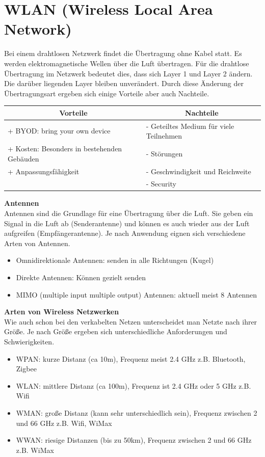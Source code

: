 \chapter{WLAN (Wireless Local Area Network)}
Bei einem drahtlosen Netzwerk findet die Übertragung ohne Kabel statt. Es werden elektromagnetische Wellen über die Luft übertragen. Für die drahtlose Übertragung im Netzwerk bedeutet dies, dass sich Layer 1 und Layer 2 ändern. Die darüber liegenden Layer bleiben unverändert. Durch diese Änderung der Übertragungsart ergeben sich einige Vorteile aber auch Nachteile.

\begin{table}[H]
	\begin{tabular}{l|l}
		\multicolumn{1}{c}{Vorteile} & \multicolumn{1}{c}{Nachteile} \\
		\hline
		+ BYOD: bring your own device & - Geteiltes Medium für viele Teilnehmen \\
		+ Kosten: Besonders in bestehenden Gebäuden & - Störungen \\
		+ Anpassungsfähigkeit & - Geschwindigkeit und Reichweite \\
		& - Security \\
	\end{tabular}
\end{table}

\textbf{Antennen} \\
Antennen sind die Grundlage für eine Übertragung über die Luft. Sie geben ein Signal in die Luft ab (Senderantenne) und können es auch wieder aus der Luft aufgreifen (Empfängerantenne). Je nach Anwendung eignen sich verschiedene Arten von Antennen.
\begin{itemize}
	\item Omnidirektionale Antennen: senden in alle Richtungen (Kugel)
	\item Direkte Antennen: Können gezielt senden
	\item MIMO (multiple input multiple output) Antennen: aktuell meist 8 Antennen
\end{itemize}

\textbf{Arten von Wireless Netzwerken} \\
Wie auch schon bei den verkabelten Netzen unterscheidet man Netzte nach ihrer Größe. Je nach Größe ergeben sich unterschiedliche Anforderungen und Schwierigkeiten.
\begin{itemize}
	\item WPAN: kurze Distanz (ca 10m), Frequenz meist 2.4 GHz z.B. Bluetooth, Zigbee
	\item WLAN: mittlere Distanz (ca 100m), Frequenz ist 2.4 GHz oder 5 GHz z.B. Wifi
	\item WMAN: große Distanz (kann sehr unterschiedlich sein), Frequenz zwischen 2 und 66 GHz z.B. Wifi, WiMax
	\item WWAN: riesige Distanzen (bis zu 50km), Frequenz zwischen 2 und 66 GHz z.B. WiMax
\end{itemize}

